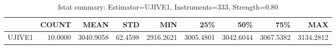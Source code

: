 \begin{table}[ht]
\centering
\caption{fstat summary: Estimator=UJIVE1, Instruments=333, Strength=0.80}
\begin{tabular}{lrrrrrrrr}
\toprule
 & COUNT & MEAN & STD & MIN & 25\% & 50\% & 75\% & MAX \\
\midrule
UJIVE1 & 10.0000 & 3040.9058 & 62.4598 & 2916.2621 & 3005.4801 & 3042.6044 & 3067.5382 & 3134.2812 \\
\bottomrule
\end{tabular}
\end{table}
